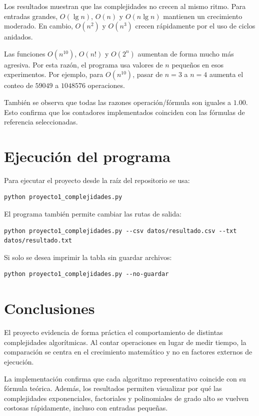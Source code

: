 \documentclass[12pt,letterpaper]{article}
\begin{document}
Los resultados muestran que las complejidades no crecen al mismo ritmo. Para entradas grandes, $O(\lg n)$, $O(n)$ y $O(n\lg n)$ mantienen un crecimiento moderado. En cambio, $O(n^2)$ y $O(n^3)$ crecen rápidamente por el uso de ciclos anidados.

Las funciones $O(n^{10})$, $O(n!)$ y $O(2^n)$ aumentan de forma mucho más agresiva. Por esta razón, el programa usa valores de $n$ pequeños en esos experimentos. Por ejemplo, para $O(n^{10})$, pasar de $n=3$ a $n=4$ aumenta el conteo de $59049$ a $1048576$ operaciones.

También se observa que todas las razones operación/fórmula son iguales a $1.00$. Esto confirma que los contadores implementados coinciden con las fórmulas de referencia seleccionadas.

\section{Ejecución del programa}

Para ejecutar el proyecto desde la raíz del repositorio se usa:

\begin{lstlisting}[style=textstyle]
python proyecto1_complejidades.py
\end{lstlisting}

El programa también permite cambiar las rutas de salida:

\begin{lstlisting}[style=textstyle]
python proyecto1_complejidades.py --csv datos/resultado.csv --txt datos/resultado.txt
\end{lstlisting}

Si solo se desea imprimir la tabla sin guardar archivos:

\begin{lstlisting}[style=textstyle]
python proyecto1_complejidades.py --no-guardar
\end{lstlisting}

\section{Conclusiones}

El proyecto evidencia de forma práctica el comportamiento de distintas complejidades algorítmicas. Al contar operaciones en lugar de medir tiempo, la comparación se centra en el crecimiento matemático y no en factores externos de ejecución.

La implementación confirma que cada algoritmo representativo coincide con su fórmula teórica. Además, los resultados permiten visualizar por qué las complejidades exponenciales, factoriales y polinomiales de grado alto se vuelven costosas rápidamente, incluso con entradas pequeñas.
\end{document}
